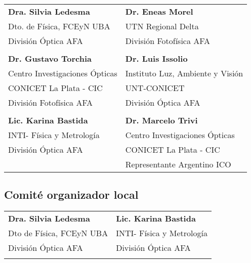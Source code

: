 \begin{center}

    \begin{tabular}{l l}
    \textbf{Dra. Silvia Ledesma}    &   \textbf{Dr. Eneas Morel}        \\
    Dto. de F\'isica, FCEyN UBA        &   UTN Regional Delta              \\
    Divisi\'on \'Optica AFA             &   Divisi\'on Fotof\'isica AFA        
\\
    \hspace{1pt}                    &   \hspace{1pt} \\
    
    \textbf{Dr. Gustavo Torchia}    &   \textbf{Dr. Luis Issolio}       \\
    Centro Investigaciones \'Opticas  &   Instituto Luz, Ambiente y Visi\'on\\
    CONICET La Plata - CIC          &   UNT-CONICET                     \\
    Divisi\'on Fotof\'isica AFA         &   Divisi\'on \'Optica AFA            
\\
    \hspace{1pt}                    &   \hspace{1pt} \\
    
    \textbf{Lic. Karina Bastida}   &   \textbf{Dr. Marcelo Trivi}      \\
    INTI- F\'isica y Metrolog\'ia       &   Centro Investigaciones \'Opticas  \\
    Divisi\'on \'Optica AFA             &   CONICET La Plata - CIC          \\
                                    &   Representante Argentino ICO     \\
    \end{tabular}

\end{center}
\vspace{2cm}

\subsection{Comit\'e organizador local}

\begin{center}

    \begin{tabular}{l l}
    \textbf{Dra. Silvia Ledesma}    &   \textbf{Lic. Karina Bastida}  \\
    Dto de F\'isica, FCEyN UBA        &   INTI- F\'isica y Metrolog\'ia      \\
    Divisi\'on \'Optica AFA             &   Divisi\'on \'Optica AFA           
\\
    \hspace{1pt}                    &   \hspace{1pt} \\
    
    \end{tabular}

\end{center}


